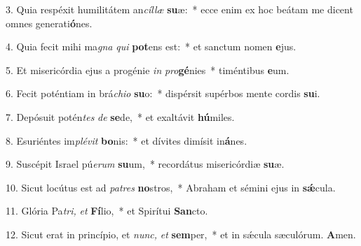 \item 3. Quia respéxit humilitátem an\textit{cíllæ} \textbf{su}æ:~* ecce enim ex hoc beátam me dicent omnes generati\textbf{ó}nes.

\item 4. Quia fecit mihi ma\textit{gna} \textit{qui} \textbf{pot}ens est:~* et sanctum nomen \textbf{e}jus.

\item 5. Et misericórdia ejus a progénie \textit{in} \textit{pro}\textbf{gé}nies~* timéntibus \textbf{e}um.

\item 6. Fecit poténtiam in brá\textit{chio} \textbf{su}o:~* dispérsit supérbos mente cordis \textbf{su}i.

\item 7. Depósuit potén\textit{tes} \textit{de} \textbf{se}de,~* et exaltávit \textbf{hú}miles.

\item 8. Esuriéntes im\textit{plévit} \textbf{bo}nis:~* et dívites dimísit in\textbf{á}nes.

\item 9. Suscépit Israel pú\textit{erum} \textbf{su}um,~* recordátus misericórdiæ \textbf{su}æ.

\item 10. Sicut locútus est ad \textit{patres} \textbf{no}stros,~* Abraham et sémini ejus in \textbf{sǽ}cula.

\item 11. Glória Pa\hspace{0.01em}\textit{tri,} \textit{et} \textbf{Fí}lio,~* et Spirítui \textbf{San}cto.

\item 12. Sicut erat in princípio, et \textit{nunc,} \textit{et} \textbf{sem}per,~* et in sǽcula sæculórum. \textbf{A}men.